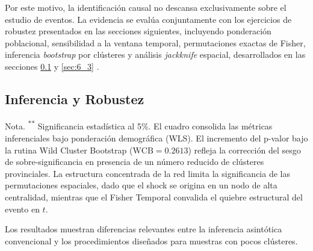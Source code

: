 Por este motivo, la identificaci\'on causal no descansa exclusivamente sobre el estudio de eventos. La evidencia se eval\'ua conjuntamente con los ejercicios de robustez presentados en las secciones siguientes, incluyendo ponderaci\'on poblacional, sensibilidad a la ventana temporal, permutaciones exactas de Fisher, inferencia \textit{bootstrap} por cl\'usteres y an\'alisis \textit{jackknife} espacial, desarrollados en las secciones \ref{sec:6_2} y \ref{sec:6_3} \citep{callaway2024continuous, rambachan2023credible}.

\subsection{Inferencia y Robustez}
\label{sec:6_2}

\begin{table}[H] 
\centering 
\caption{Consolidado de Inferencia No Param\'etrica y Bootstrap ante Restricciones Muestrales ($N=9$)} 
\label{tab:inferencia_robusta} 
\small 
{}
\vspace{0.15cm} 
\begin{flushleft} 
\small{Nota. \textsuperscript{**} Significancia estad\'istica al 5\%. El cuadro consolida las m\'etricas inferenciales bajo ponderaci\'on demogr\'afica (WLS). El incremento del p-valor bajo la rutina Wild Cluster Bootstrap ($\text{WCB} = 0.2613$) refleja la correcci\'on del sesgo de sobre-significancia en presencia de un n\'umero reducido de cl\'usteres provinciales. La estructura concentrada de la red limita la significancia de las permutaciones espaciales, dado que el shock se origina en un nodo de alta centralidad, mientras que el Fisher Temporal convalida el quiebre estructural del evento en $t$.} 
\end{flushleft}
\end{table}

Los resultados muestran diferencias relevantes entre la inferencia asint\'otica convencional y los procedimientos dise\~nados para muestras con pocos cl\'usteres.

